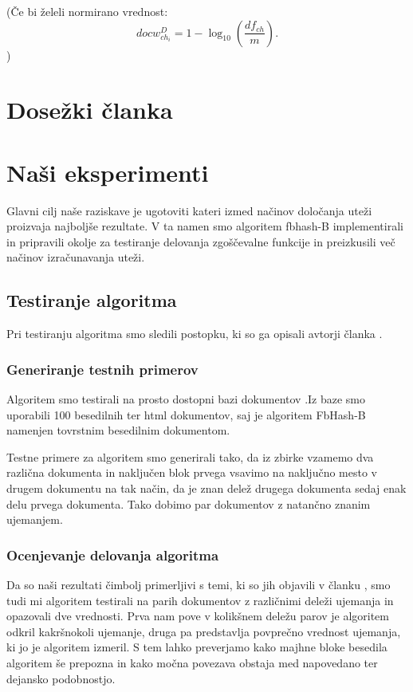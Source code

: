 \documentclass{acm_proc_article-sp}
\begin{document}
(Če bi želeli normirano vrednost:
\[ docw_{ch_i}^{D} = 1 - \log_{10}\left(\frac{df_{ch}}{m}\right).\]
)
\section{Dose\v{z}ki \v{c}lanka}
\section{Na\v{s}i eksperimenti}
Glavni cilj naše raziskave je ugotoviti kateri izmed načinov določanja uteži proizvaja najboljše rezultate. V ta namen smo algoritem fbhash-B implementirali in pripravili okolje za testiranje delovanja zgoščevalne funkcije in preizkusili več načinov izračunavanja uteži.

\subsection{Testiranje algoritma}
Pri testiranju algoritma smo sledili postopku, ki so ga opisali avtorji članka \cite{fbhash}.

\subsubsection{Generiranje testnih primerov}
Algoritem smo testirali na prosto dostopni bazi dokumentov \cite{roussev2011evaluation}.Iz baze smo uporabili 100 besedilnih ter html dokumentov, saj je algoritem FbHash-B namenjen tovrstnim besedilnim dokumentom.

Testne primere za algoritem smo generirali tako, da iz zbirke vzamemo dva različna dokumenta in naključen blok prvega vsavimo na naključno mesto v drugem dokumentu na tak način, da je znan delež drugega dokumenta sedaj enak delu prvega dokumenta. Tako dobimo par dokumentov z natančno znanim ujemanjem.

\subsubsection{Ocenjevanje delovanja algoritma}
Da so naši rezultati čimbolj primerljivi s temi, ki so jih objavili v članku \cite{fbhash}, smo tudi mi algoritem testirali na parih dokumentov z različnimi deleži ujemanja in opazovali dve vrednosti. Prva nam pove v kolikšnem deležu parov je algoritem odkril kakršnokoli ujemanje, druga pa predstavlja povprečno vrednost ujemanja, ki jo je algoritem izmeril. S tem lahko preverjamo kako majhne bloke besedila algoritem še prepozna in kako močna povezava obstaja med napovedano ter dejansko podobnostjo.
\end{document}
